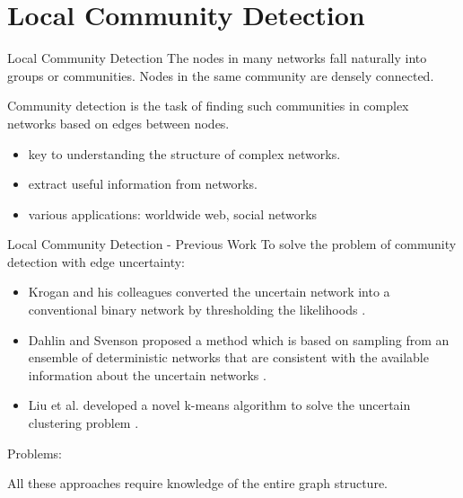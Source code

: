 \documentclass[9pt]{beamer}
\begin{document}
\section{Local Community Detection}

\begin{frame}{Local Community Detection}
The nodes in many networks fall naturally into groups or communities. Nodes in the same community are densely connected.

Community detection is the task of finding such communities in complex networks based on edges between nodes. 
\begin{itemize}
\item key to understanding the structure of complex networks.
\item extract useful information from networks.
\item various applications: worldwide web, social networks
\end{itemize}
\end{frame}


\begin{frame}{Local Community Detection - Previous Work}
To solve the problem of community detection with edge uncertainty: 
\begin{itemize}
\item Krogan and his colleagues converted the uncertain network into a conventional binary network by thresholding the likelihoods \cite{krogan2006global}.
\item Dahlin and Svenson proposed a method which is based on sampling from an ensemble of deterministic networks that are consistent with the available information about the uncertain networks \cite{dahlin2011method}.
\item Liu et al. developed a novel k-means algorithm to solve the uncertain clustering problem \cite{liureliable}.
\end{itemize}

Problems:

All these approaches require knowledge of the entire graph structure.

\end{frame}
\end{document}
